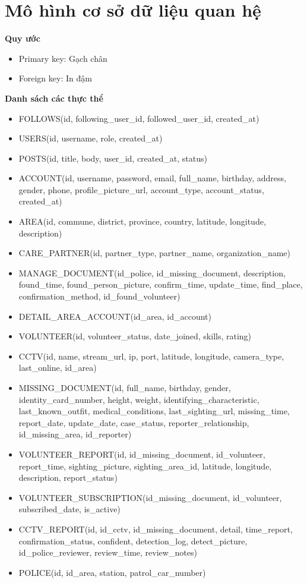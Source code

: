 \documentclass[../DoAn.tex]{subfiles}
\begin{document}
\section{Mô hình cơ sở dữ liệu quan hệ}
\textbf{Quy ước}
\begin{itemize}
	\item Primary key: Gạch chân
	\item Foreign key: In đậm
\end{itemize}
\textbf{Danh sách các thực thể}
\begin{itemize}
	\item FOLLOWS(id, following\_user\_id, followed\_user\_id, created\_at)
	\item USERS(id, username, role, created\_at)
	\item POSTS(id, title, body, user\_id, created\_at, status)
	\item ACCOUNT(id, username, password, email, full\_name, birthday, address, gender, phone, profile\_picture\_url, account\_type, account\_status, created\_at)
	\item AREA(id, commune, district, province, country, latitude, longitude, description)
	\item CARE\_PARTNER(id, partner\_type, partner\_name, organization\_name)
	\item MANAGE\_DOCUMENT(id\_police, id\_missing\_document, description, found\_time, found\_person\_picture, confirm\_time, update\_time, find\_place, confirmation\_method, id\_found\_volunteer)
	\item DETAIL\_AREA\_ACCOUNT(id\_area, id\_account)
	\item VOLUNTEER(id, volunteer\_status, date\_joined, skills, rating)
	\item CCTV(id, name, stream\_url, ip, port, latitude, longitude, camera\_type, last\_online, id\_area)
	\item MISSING\_DOCUMENT(id, full\_name, birthday, gender, identity\_card\_number, height, weight, identifying\_characteristic, last\_known\_outfit, medical\_conditions, last\_sighting\_url, missing\_time, report\_date, update\_date, case\_status, reporter\_relationship, id\_missing\_area, id\_reporter)
	\item VOLUNTEER\_REPORT(id, id\_missing\_document, id\_volunteer, report\_time, sighting\_picture, sighting\_area\_id, latitude, longitude, description, report\_status)
	\item VOLUNTEER\_SUBSCRIPTION(id\_missing\_document, id\_volunteer, subscribed\_date, is\_active)
	\item CCTV\_REPORT(id, id\_cctv, id\_missing\_document, detail, time\_report, confirmation\_status, confident, detection\_log, detect\_picture, id\_police\_reviewer, review\_time, review\_notes)
	\item POLICE(id, id\_area, station, patrol\_car\_number)
\end{itemize}
\end{document}
